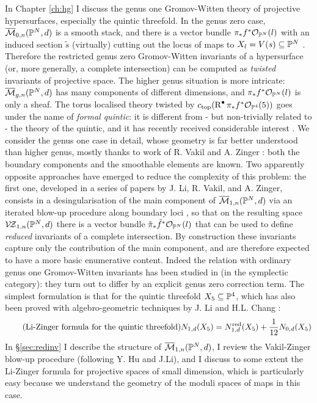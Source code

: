 In Chapter \ref{ch:hg} I discuss the genus one Gromov-Witten theory of projective hypersurfaces, especially the quintic threefold. In the genus zero case, $\overline{\mathcal{M}}_{0,n}(\mathbb P^N,d)$ is a smooth stack, and there is a vector bundle $\pi_*f^*\mathcal{O}_{\mathbb P^N}(l)$ with an induced section $\tilde{s}$ (virtually) cutting out the locus of maps to $X_l=V(s)\subseteq \mathbb P^N$ \cite{CKL}. Therefore the restricted genus zero Gromov-Witten invariants of a hypersurface (or, more generally, a complete intersection) can be computed as \emph{twisted} invariants of projective space. The higher genus situation is more intricate: $\overline{\mathcal{M}}_{g,n}(\mathbb P^N,d)$ has many components of different dimensions, and $\pi_*f^*\mathcal{O}_{\mathbb P^N}(l)$ is only a sheaf. The torus localised theory twisted by $c_{\rm{top}}(\operatorname{R}^{\bullet}\pi_*f^*\mathcal{O}_{\mathbb P^4}(5))$ goes under the name of \emph{formal quintic}: it is different from - but non-trivially related to - the theory of the quintic, and it has recently received considerable interest \cites{LhoPandha,GJR}. We consider the genus one case in detail, whose geometry is far better understood than higher genus, mostly thanks to work of R. Vakil and A. Zinger \cites{Vre,VZpreview}: both the boundary components and the smoothable elements are known. Two apparently opposite approaches have emerged to reduce the complexity of this problem: the first one, developed in a series of papers by J. Li, R. Vakil, and A. Zinger, consists in a desingularisation of the main component of $\overline{\mathcal{M}}_{1,n}(\mathbb P^N,d)$ via an iterated blow-up procedure along boundary loci \cites{VZ,HL}, so that on the resulting space $\mathcal{V\!Z}_{1,n}(\mathbb P^N,d)$ there is a vector bundle $\tilde{\pi}_*\tilde{f}^*\mathcal{O}_{\mathbb P^N}(l)$ that can be used to define \emph{reduced} invariants of a complete intersection. By construction these invariants capture only the contribution of the main component, and are therefore expected to have a more basic enumerative content. Indeed the relation with ordinary genus one Gromov-Witten invariants has been studied in \cites{LZ,zingerstvsred} (in the symplectic category): they turn out to differ by an explicit genus zero correction term. The simplest formulation is that for the quintic threefold $X_5\subseteq\mathbb P^4$, which has also been proved with algebro-geometric techniques by J. Li and H.L. Chang \cite{CL}:
\begin{equation}\tag{Li-Zinger formula for the quintic threefold}
 N_{1,d}(X_5)=N_{1,d}^{\rm{red}}(X_5)+\frac{1}{12}N_{0,d}(X_5)
\end{equation}
In \S \ref{sec:redinv} I describe the structure of $\overline{\mathcal{M}}_{1,n}(\mathbb P^N,d)$, I review the Vakil-Zinger blow-up procedure (following Y. Hu and J.Li), and I discuss to some extent the Li-Zinger formula for projective spaces of small dimension, which is particularly easy because we understand the geometry of the moduli spaces of maps in this case.


